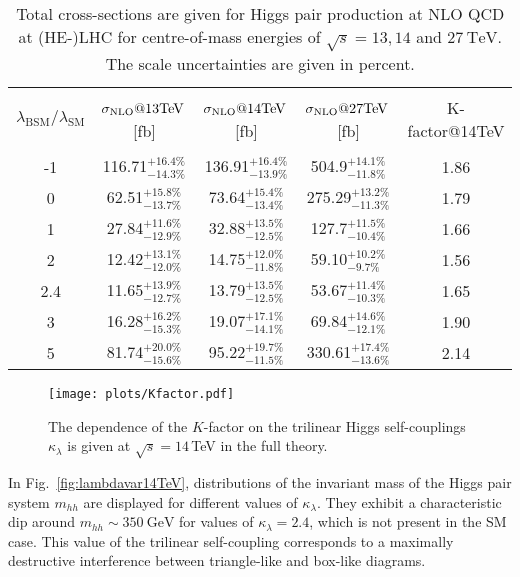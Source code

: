 \documentclass[a4paper]{jpconf}
\newcommand{\GeV}{\ensuremath{\mathrm{\:GeV}}}
\newcommand{\TeV}{\ensuremath{\mathrm{\:TeV}}}
\newcommand{\chhh}{\ensuremath{\kappa_{\lambda}}}
\begin{document}
\begin{table}[htb!]
\begin{center}
\begin{tabular}{| c | c | c |c|c|}
\hline
&&&&\\
$\lambda_{\mathrm{BSM}}/\lambda_{\mathrm{SM}}$ & $\sigma_{\rm{NLO}}@13 \mathrm{TeV}$\,[fb]& $\sigma_{\rm{NLO}}@14 \mathrm{TeV}$\,[fb] & $\sigma_{\rm{NLO}}@27 \mathrm{TeV}$\,[fb] &K-factor@14TeV\\
&&&&\\
\hline
-1& 116.71$^{+16.4\%}_{-14.3\%}$  & 136.91$^{+16.4\%}_{-13.9\%}$& 504.9$^{+14.1\%}_{-11.8\%}$ & 1.86 \\
\hline
0& 62.51$^{+15.8\%}_{-13.7\%}$ & 73.64$^{+15.4\%}_{-13.4\%}$& 275.29$^{+13.2\%}_{-11.3\%}$& 1.79  \\
\hline 
1& 27.84$^{+11.6\%}_{-12.9\%}$ & 32.88$^{+13.5\%}_{-12.5\%}$&127.7$^{+11.5\%}_{-10.4\%}$ &1.66\\
\hline
2 & 12.42$^{+13.1\%}_{-12.0\%}$ & 14.75$^{+12.0\%}_{-11.8\%}$ &  59.10$^{+10.2\%}_{-9.7\%}$ & 1.56 \\
\hline
2.4& 11.65$^{+13.9\%}_{-12.7\%}$ & 13.79$^{+13.5\%}_{-12.5\%}$& 53.67$^{+11.4\%}_{-10.3\%}$ & 1.65 \\
\hline
3& 16.28$^{+16.2\%}_{-15.3\%}$ & 19.07$^{+17.1\%}_{-14.1\%}$ & 69.84$^{+14.6\%}_{-12.1\%}$ & 1.90 \\
\hline 
5& 81.74$^{+20.0\%}_{-15.6\%}$  & 95.22$^{+19.7\%}_{-11.5\%}$& 330.61$^{+17.4\%}_{-13.6\%}$ & 2.14 \\
\hline 
\end{tabular}
\end{center}
\caption{Total cross-sections are given for Higgs pair production at NLO QCD at (HE-)LHC for centre-of-mass energies of $\sqrt{s}=13,14$ and $27 \TeV$. The scale uncertainties are given in percent.
\label{tab:sigmatot}}
\end{table}

\begin{figure}[htb!]
  \centering
    \texttt{[image: plots/Kfactor.pdf]}
\caption{The dependence of the $K$-factor on the trilinear Higgs self-couplings $\chhh$ is given at $\sqrt{s}=14$\,TeV in the full theory.}
\label{fig:Kfacvariation}
\end{figure}

In Fig.~\ref{fig:lambdavar14TeV}, distributions of the invariant mass of the Higgs pair system $m_{hh}$ are displayed for different values of $\chhh$. They exhibit a characteristic dip around $m_{hh} \sim 350 \GeV$ for values of $\chhh = 2.4$, which is not present in the SM case. This value of the trilinear self-coupling corresponds to a maximally destructive interference between triangle-like and box-like diagrams.
\end{document}

